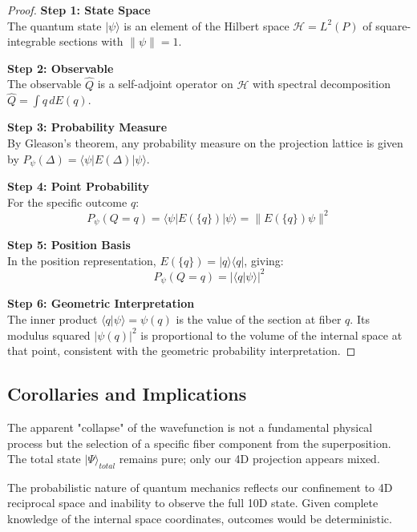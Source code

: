 \begin{proof}
\textbf{Step 1: State Space}\\
The quantum state $|\psi\rangle$ is an element of the Hilbert space $\mathcal{H} = L^2(P)$ of square-integrable sections with $\|\psi\| = 1$.

\textbf{Step 2: Observable}\\
The observable $\hat{Q}$ is a self-adjoint operator on $\mathcal{H}$ with spectral decomposition $\hat{Q} = \int q \, dE(q)$.

\textbf{Step 3: Probability Measure}\\
By Gleason's theorem, any probability measure on the projection lattice is given by $P_\psi(\Delta) = \langle\psi|E(\Delta)|\psi\rangle$.

\textbf{Step 4: Point Probability}\\
For the specific outcome $q$:
\begin{equation}
    P_\psi(Q = q) = \langle\psi|E(\{q\})|\psi\rangle = \|E(\{q\})\psi\|^2
\end{equation}

\textbf{Step 5: Position Basis}\\
In the position representation, $E(\{q\}) = |q\rangle\langle q|$, giving:
\begin{equation}
    P_\psi(Q = q) = |\langle q|\psi\rangle|^2
\end{equation}

\textbf{Step 6: Geometric Interpretation}\\
The inner product $\langle q|\psi\rangle = \psi(q)$ is the value of the section at fiber $q$. Its modulus squared $|\psi(q)|^2$ is proportional to the volume of the internal space at that point, consistent with the geometric probability interpretation.
\end{proof}

\subsection{Corollaries and Implications}

\begin{corollary}
The apparent "collapse" of the wavefunction is not a fundamental physical process but the selection of a specific fiber component from the superposition. The total state $|\Psi\rangle_{total}$ remains pure; only our 4D projection appears mixed.
\end{corollary}

\begin{corollary}
The probabilistic nature of quantum mechanics reflects our confinement to 4D reciprocal space and inability to observe the full 10D state. Given complete knowledge of the internal space coordinates, outcomes would be deterministic.
\end{corollary}


